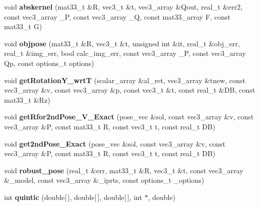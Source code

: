\begin{DoxyCompactItemize}
\item 
void {\bfseries abskernel} (mat33\+\_\+t \&R, vec3\+\_\+t \&t, vec3\+\_\+array \&Qout, real\+\_\+t \&err2, const vec3\+\_\+array \+\_\+P, const vec3\+\_\+array \+\_\+Q, const mat33\+\_\+array F, const mat33\+\_\+t G)\hypertarget{namespacekukadu_a81f76c277fc707815b635945f095405f}{}\label{namespacekukadu_a81f76c277fc707815b635945f095405f}

\item 
void {\bfseries objpose} (mat33\+\_\+t \&R, vec3\+\_\+t \&t, unsigned int \&it, real\+\_\+t \&obj\+\_\+err, real\+\_\+t \&img\+\_\+err, bool calc\+\_\+img\+\_\+err, const vec3\+\_\+array \+\_\+P, const vec3\+\_\+array Qp, const options\+\_\+t options)\hypertarget{namespacekukadu_a309fbb0e0d886bde77b100d828e34de3}{}\label{namespacekukadu_a309fbb0e0d886bde77b100d828e34de3}

\item 
void {\bfseries get\+Rotation\+Y\+\_\+wrtT} (scalar\+\_\+array \&al\+\_\+ret, vec3\+\_\+array \&tnew, const vec3\+\_\+array \&v, const vec3\+\_\+array \&p, const vec3\+\_\+t \&t, const real\+\_\+t \&DB, const mat33\+\_\+t \&Rz)\hypertarget{namespacekukadu_a171ea6d7c696cde17555a0b8673615bc}{}\label{namespacekukadu_a171ea6d7c696cde17555a0b8673615bc}

\item 
void {\bfseries get\+Rfor2nd\+Pose\+\_\+\+V\+\_\+\+Exact} (pose\+\_\+vec \&sol, const vec3\+\_\+array \&v, const vec3\+\_\+array \&P, const mat33\+\_\+t R, const vec3\+\_\+t t, const real\+\_\+t DB)\hypertarget{namespacekukadu_ab5991245bbdbf117ba029419915ad464}{}\label{namespacekukadu_ab5991245bbdbf117ba029419915ad464}

\item 
void {\bfseries get2nd\+Pose\+\_\+\+Exact} (pose\+\_\+vec \&sol, const vec3\+\_\+array \&v, const vec3\+\_\+array \&P, const mat33\+\_\+t R, const vec3\+\_\+t t, const real\+\_\+t DB)\hypertarget{namespacekukadu_a8ce55dca0d8d9f75b9cd5eecd4b910f6}{}\label{namespacekukadu_a8ce55dca0d8d9f75b9cd5eecd4b910f6}

\item 
void {\bfseries robust\+\_\+pose} (real\+\_\+t \&err, mat33\+\_\+t \&R, vec3\+\_\+t \&t, const vec3\+\_\+array \&\+\_\+model, const vec3\+\_\+array \&\+\_\+iprts, const options\+\_\+t \+\_\+options)\hypertarget{namespacekukadu_a6f626556a3523aff99c6ebf20d2e21b0}{}\label{namespacekukadu_a6f626556a3523aff99c6ebf20d2e21b0}

\item 
int {\bfseries quintic} (double\mbox{[}$\,$\mbox{]}, double\mbox{[}$\,$\mbox{]}, double\mbox{[}$\,$\mbox{]}, int $\ast$, double)\hypertarget{namespacekukadu_a4e7be66cca601fa21c07f18794caf9dd}{}\label{namespacekukadu_a4e7be66cca601fa21c07f18794caf9dd}


\end{DoxyCompactItemize}
